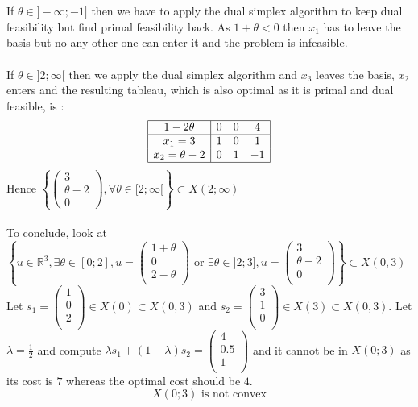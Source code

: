 \documentclass{article}
\begin{document}
\\\\
If $\theta \in ]-\infty;-1]$ then we have to apply the dual simplex algorithm to keep dual feasibility but find primal feasibility back. As $1+\theta<0$ then $x_1$ has to leave the basis but no any other one can enter it and the problem is infeasible.
\\\\
If $\theta \in ]2;\infty[$ then we apply the dual simplex algorithm and $x_3$ leaves the basis, $x_2$ enters and the resulting tableau, which is also optimal as it is primal and dual feasible, is : 
$$\begin{array}{|c|ccc|}\hline
    1-2\theta & 0 & 0 & 4\\\hline
    x_1 =3 & 1 & 0 & 1 \\
    x_2 = \theta - 2 & 0 & 1 & -1\\\hline
\end{array}$$ 
Hence $ \left\{\left(\begin{array}{c}3\\\theta-2\\0\end{array}\right),\forall \theta \in [2;\infty[\right\}\subset X(2;\infty)$
\\\\
To conclude, look at $\left\{u\in\mathbb{R}^3, \exists \theta\in [0;2], u =\left(\begin{array}{c}
    1+\theta\\
    0\\
    2-\theta\\
\end{array}\right) \text{ or } \exists \theta \in ]2;3], u = \left(\begin{array}{c}
        3\\
        \theta-2\\
        0\\
\end{array}\right)\right\}\subset X(0,3)$\\ Let $s_1 = \left(\begin{array}{c}
    1\\
    0\\
    2\\
\end{array}\right) \in X(0)\subset X(0,3)$ and $s_2 = \left(\begin{array}{c}
    3\\
    1\\
    0\\
\end{array}\right)\in X(3)\subset X(0,3)$. Let $\lambda = \frac{1}{2}$ and compute $\lambda s_1 + (1-\lambda) s_2 = \left(\begin{array}{c}
    4\\
    0.5\\
    1\\
\end{array}\right)$ and it cannot be in $X(0;3)$ as its cost is $7$ whereas the optimal cost should be $4$. $$\boxed{X(0;3)\text{ is not convex}}$$ 
\end{document}
